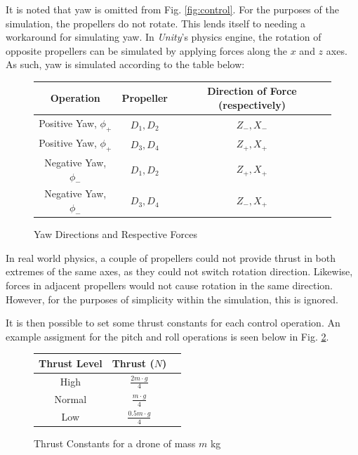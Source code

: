 \documentclass{article}
\begin{document}
It is noted that yaw is omitted from Fig. \ref{fig:control}. For the purposes of the simulation, the propellers do not rotate. This lends itself to needing a workaround for simulating yaw. In \emph{Unity}'s physics engine, the rotation of opposite propellers can be simulated by applying forces along the $x$ and $z$ axes. As such, yaw is simulated according to the table below:

\begin{figure}[H]
    \begin{center}
    \begin{tabular}{| c | c | c |} 
    \hline
    Operation & Propeller & Direction of Force (respectively) \\ 
    \hline
    Positive Yaw, $\phi_+$ & $D_1, D_2$ & $Z_-, X_-$ \\
    \hline
    Positive Yaw, $\phi_+$ & $D_3, D_4$ & $Z_+, X_+$ \\
    \hline
    Negative Yaw, $\phi_-$ & $D_1, D_2$ & $Z_+, X_+$ \\
    \hline
    Negative Yaw, $\phi_-$ & $D_3, D_4$ & $Z_-, X_+$ \\
    \hline
    \end{tabular}
    \end{center}
    \caption{Yaw Directions and Respective Forces}
    \label{fig:yaw-control}
\end{figure}

In real world physics, a couple of propellers could not provide thrust in both extremes of the same axes, as they could not switch rotation direction. Likewise, forces in adjacent propellers would not cause rotation in the same direction. However, for the purposes of simplicity within the simulation, this is ignored.

It is then possible to set some thrust constants for each control operation. An example assigment for the pitch and roll operations is seen below in Fig. \ref{fig:thrust-constants}.

\begin{figure}[H]
    \begin{center}
    \begin{tabular}{| c | c | c |} 
    \hline
    Thrust Level & Thrust ($N$) \\ 
    \hline
    High & $\frac{2m \cdot g}{4}$\\
    \hline
    Normal & $\frac{m \cdot g}{4}$\\
    \hline
    Low & $\frac{0.5m \cdot g}{4}$\\
    \hline
    \end{tabular}
    \end{center}
    \caption{Thrust Constants for a drone of mass $m$ kg}
    \label{fig:thrust-constants}
\end{figure}
\end{document}
